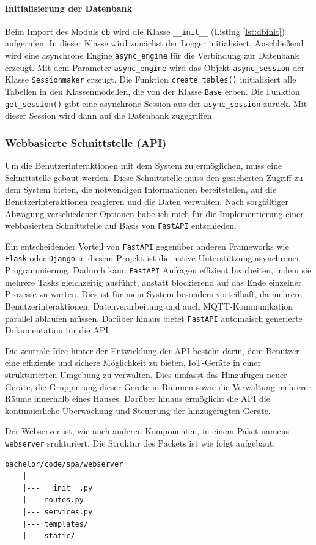 \documentclass[12pt, letterpaper]{article}
\begin{document}
  \paragraph{Initialisierung der Datenbank}
  \par \textbf{}
  \par Beim Import des Moduls \texttt{db} wird die Klasse \texttt{\_\_init\_\_} (Listing \ref{lst:dbinit}) aufgerufen. In dieser Klasse wird zunächst der Logger initialisiert. Anschließend wird eine asynchrone Engine \texttt{async\_engine} für die Verbindung zur Datenbank erzeugt. Mit dem Parameter \texttt{async\_engine} wird das Objekt \texttt{async\_session} der Klasse \texttt{Sessionmaker} erzeugt. Die Funktion \texttt{create\_tables()} initialisiert alle Tabellen in den Klassenmodellen, die von der Klasse \texttt{Base} erben. Die Funktion \texttt{get\_session()} gibt eine asynchrone Session aus der \texttt{async\_session} zurück. Mit dieser Session wird dann auf die Datenbank zugegriffen. 
% 
  \subsubsection{Webbasierte Schnittstelle (API)} 
  \par Um die Benutzerinteraktionen mit dem System zu ermöglichen, muss eine Schnittstelle gebaut werden. Diese Schnittstelle muss den gesicherten Zugriff zu dem System bieten, die notwendigen Informationen bereitstellen, auf die Benutzerinteraktionen reagieren und die Daten verwalten. Nach sorgfältiger Abwägung verschiedener Optionen habe ich mich für die Implementierung einer webbasierten Schnittstelle auf Basis von \texttt{FastAPI} entschieden.
  \par Ein entscheidender Vorteil von \texttt{FastAPI} gegenüber anderen Frameworks wie \texttt{Flask} oder \texttt{Django} in diesem Projekt ist die native Unterstützung asynchroner Programmierung. Dadurch kann \texttt{FastAPI} Anfragen effizient bearbeiten, indem sie mehrere Tasks gleichzeitig ausführt, anstatt blockierend auf das Ende einzelner Prozesse zu warten. Dies ist für mein System besonders vorteilhaft, da mehrere Benutzerinteraktionen, Datenverarbeitung und auch MQTT-Kommunikation parallel ablaufen müssen. Darüber hinaus bietet \texttt{FastAPI} automaisch generierte Dokumentation für die API.
  \par Die zentrale Idee hinter der Entwicklung der API besteht darin, dem Benutzer eine effiziente und sichere Möglichkeit zu bieten, IoT-Geräte in einer strukturierten Umgebung zu verwalten. Dies umfasst das Hinzufügen neuer Geräte, die Gruppierung dieser Geräte in Räumen sowie die Verwaltung mehrerer Räume innerhalb eines Hauses. Darüber hinaus ermöglicht die API die kontinuierliche Überwachung und Steuerung der hinzugefügten Geräte.
  \par Der Webserver ist, wie auch anderen Komponenten, in einem Paket namens \texttt{webserver} srukturiert. Die Struktur des Packets ist wie folgt aufgebaut:
  \begin{Verbatim}[frame=single]
    bachelor/code/spa/webserver
    |
    |--- __init__.py
    |--- routes.py
    |--- services.py
    |--- templates/
    |--- static/
  \end{Verbatim}
  
\end{document}
